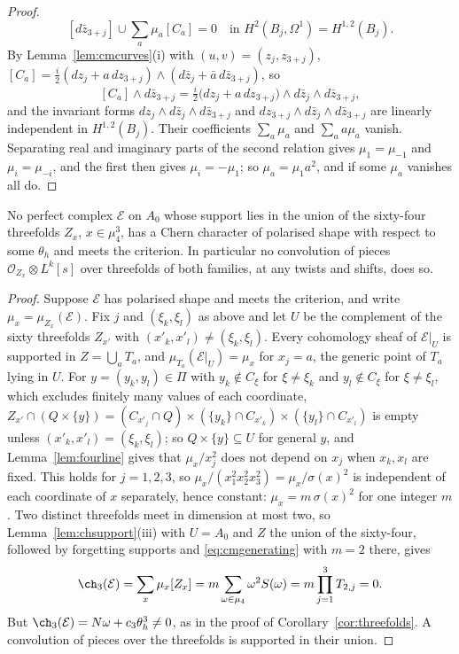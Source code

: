 \begin{proof}
\[
[d\bar z_{3+j}]\cup\sum_{a}\mu_{a}[C_{a}]=0\quad\text{in }H^{2}(B_{j},\Omega^{1})=H^{1,2}(B_{j}).
\]
By Lemma~\ref{lem:cmcurves}(i) with $(u,v)=(z_{j},z_{3+j})$, $[C_{a}]=\tfrac{i}{2}(dz_{j}+a\,dz_{3+j})\wedge(d\bar z_{j}+\bar a\,d\bar z_{3+j})$, so
\[
[C_{a}]\wedge d\bar z_{3+j}=\tfrac{i}{2}\bigl(dz_{j}+a\,dz_{3+j}\bigr)\wedge d\bar z_{j}\wedge d\bar z_{3+j},
\]
and the invariant forms $dz_{j}\wedge d\bar z_{j}\wedge d\bar z_{3+j}$ and $dz_{3+j}\wedge d\bar z_{j}\wedge d\bar z_{3+j}$ are linearly independent in $H^{1,2}(B_{j})$. Their coefficients $\sum_{a}\mu_{a}$ and $\sum_{a}a\mu_{a}$ vanish. Separating real and imaginary parts of the second relation gives $\mu_{1}=\mu_{-1}$ and $\mu_{i}=\mu_{-i}$, and the first then gives $\mu_{i}=-\mu_{1}$; so $\mu_{a}=\mu_{1}a^{2}$, and if some $\mu_{a}$ vanishes all do.
\end{proof}

\begin{theorem}\label{thm:sixtyfour}
No perfect complex $\mathcal{E}$ on $A_{0}$ whose support lies in the union of the sixty-four threefolds $Z_{x}$, $x\in\mu_{4}^{3}$, has a Chern character of polarised shape with respect to some $\theta_{h}$ and meets the criterion. In particular no convolution of pieces $\mathcal{O}_{Z_{x}}\otimes L^{k}[s]$ over threefolds of both families, at any twists and shifts, does so.
\end{theorem}

\begin{proof}
Suppose $\mathcal{E}$ has polarised shape and meets the criterion, and write $\mu_{x}=\mu_{Z_{x}}(\mathcal{E})$. Fix $j$ and $(\xi_{k},\xi_{l})$ as above and let $U$ be the complement of the sixty threefolds $Z_{x'}$ with $(x'_{k},x'_{l})\ne(\xi_{k},\xi_{l})$. Every cohomology sheaf of $\mathcal{E}|_{U}$ is supported in $Z=\bigcup_{a}T_{a}$, and $\mu_{T_{a}}(\mathcal{E}|_{U})=\mu_{x}$ for $x_{j}=a$, the generic point of $T_{a}$ lying in $U$. For $y=(y_{k},y_{l})\in\Pi$ with $y_{k}\notin C_{\xi}$ for $\xi\ne\xi_{k}$ and $y_{l}\notin C_{\xi}$ for $\xi\ne\xi_{l}$, which excludes finitely many values of each coordinate, $Z_{x'}\cap(Q\times\{y\})=(C_{x'_{j}}\cap Q)\times(\{y_{k}\}\cap C_{x'_{k}})\times(\{y_{l}\}\cap C_{x'_{l}})$ is empty unless $(x'_{k},x'_{l})=(\xi_{k},\xi_{l})$; so $Q\times\{y\}\subseteq U$ for general $y$, and Lemma~\ref{lem:fourline} gives that $\mu_{x}/x_{j}^{2}$ does not depend on $x_{j}$ when $x_{k},x_{l}$ are fixed. This holds for $j=1,2,3$, so $\mu_{x}/(x_{1}^{2}x_{2}^{2}x_{3}^{2})=\mu_{x}/\sigma(x)^{2}$ is independent of each coordinate of $x$ separately, hence constant: $\mu_{x}=m\,\sigma(x)^{2}$ for one integer $m$. Two distinct threefolds meet in dimension at most two, so Lemma~\ref{lem:chsupport}(iii) with $U=A_{0}$ and $Z$ the union of the sixty-four, followed by forgetting supports and \eqref{eq:cmgenerating} with $m=2$ there, gives
\[
\ch_{3}(\mathcal{E})=\sum_{x}\mu_{x}[Z_{x}]=m\sum_{\omega\in\mu_{4}}\omega^{2}S(\omega)=m\prod_{j=1}^{3}T_{2,j}=0 .
\]
But $\ch_{3}(\mathcal{E})=N\omega+c_{3}\theta_{h}^{3}\ne0$, as in the proof of Corollary~\ref{cor:threefolds}. A convolution of pieces over the threefolds is supported in their union.
\end{proof}

